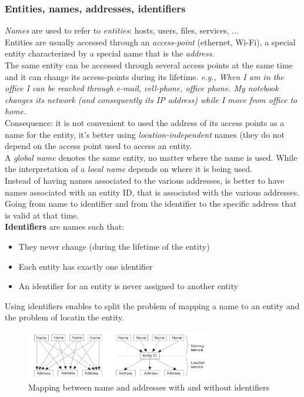 \documentclass[10pt,a4paper]{article}
\begin{document}
\subsubsection{Entities, names, addresses, identifiers}
\textit{Names} are used to refer to \textit{entities}: hosts, users, files, services, ... \\ Entities are usually accessed through an \textit{access-point} (ethernet, Wi-Fi), a special entity characterized by a special name that is the \textit{address}. \\
The same entity can be accessed through several access points at the same time and it can change its access-points during its lifetime. \textit{e.g., When I am in the office I can be reached through e-mail, cell-phone, office phone. My notebook changes its network (and consequently its IP address) while I move from office to home.} \\
Consequence: it is not convenient to used the address of its access points as a name for the entity, it's better using \textit{location-independent} names (they do not depend on the access point used to access an entity. \\ 
A \textit{global name} denotes the same entity, no matter where the name is used. While the interpretation of a \textit{local name} depends on where it is being used. \\
Instead of having names associated to the various addresses, is better to have names associated with an entity ID, that is associated with the various addresses. Going from name to identifier and from the identifier to the specific address that is valid at that time.\\ \textbf{Identifiers} are names such that:
\begin{itemize}
	\item They never change (during the lifetime of the entity)
	\item Each entity has exactly one identifier
	\item An identifier for an entity is never assigned to another entity
\end{itemize}
Using identifiers enables to split the problem of mapping a name to an entity and the problem of locatin the entity.
 \begin{figure}[h!]
 \hfill \includegraphics[width=230pt]{images/identifiers.png}\hspace*{\fill}
 \caption{Mapping between name and addresses with and without identifiers}
  \label{fig:identifiers}
\end{figure}
\end{document}
